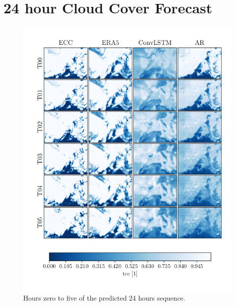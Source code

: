 \cleardoublepage
\chapter{24 hour Cloud Cover Forecast} \label{app:pred_sequence}
\begin{figure}
    \centering
    \includegraphics[scale=0.9]{python_figs/comparing_seq_part_1_of4_jan2.png}
    \caption{Hours zero to five of the predicted 24 hours sequence.}
    \label{fig:part1/4}
\end{figure}
